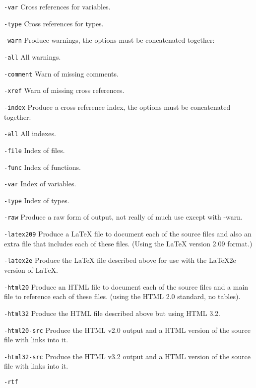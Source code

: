 \documentclass{report}
\begin{document}
\begin{list}{}{\leftmargin=1in }
\begin{list}{}{\leftmargin=1in }
\item[{\tt -var}]    Cross references for variables.
\item[{\tt -type}]   Cross references for types.
\end{list}
\item[{\tt -warn}]
Produce warnings, the options must be concatenated together:
\begin{list}{}{\leftmargin=1in }
\item[{\tt -all}]       All warnings.
\item[{\tt -comment}]   Warn of missing comments.
\item[{\tt -xref}]      Warn of missing cross references.
\end{list}
\item[{\tt -index}]
Produce a cross reference index, the options must be
concatenated together:
\begin{list}{}{\leftmargin=1in }
\item[{\tt -all}]    All indexes.
\item[{\tt -file}]   Index of files.
\item[{\tt -func}]   Index of functions.
\item[{\tt -var}]    Index of variables.
\item[{\tt -type}]   Index of types.
\end{list}
\item[{\tt -raw}]
Produce a raw form of output, not really of much use except
with -warn.
\item[{\tt -latex209}]
Produce a LaTeX file to document each of the source files and
also an extra file that includes each of these files.  (Using
the LaTeX version 2.09 format.)
\item[{\tt -latex2e}]
Produce the LaTeX file described above for use with the
LaTeX2e version of LaTeX.
\item[{\tt -html20}]
Produce an HTML file to document each of the source files and
a main file to reference each of these files.  (using the HTML
2.0 standard, no tables).
\item[{\tt -html32}]
Produce the HTML file described above but using HTML 3.2.
\item[{\tt -html20-src}]
Produce the HTML v2.0 output and a HTML version of the source
file with links into it.
\item[{\tt -html32-src}]
Produce the HTML v3.2 output and a HTML version of the source
file with links into it.
\item[{\tt -rtf}]

\end{list}
\end{document}
